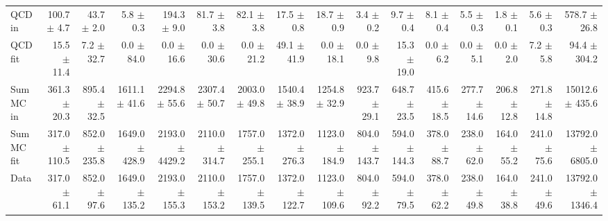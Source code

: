 \begin{table}[htbp]
{\begin{tabular}{lrrrrrrrrrrrrrrr}
\hline
QCD in & 100.7 $\pm$ 4.7 & 43.7 $\pm$ 2.0 & 5.8 $\pm$ 0.3 & 194.3 $\pm$ 9.0 & 81.7 $\pm$ 3.8 & 82.1 $\pm$ 3.8 & 17.5 $\pm$ 0.8 & 18.7 $\pm$ 0.9 & 3.4 $\pm$ 0.2 & 9.7 $\pm$ 0.4 & 8.1 $\pm$ 0.4 & 5.5 $\pm$ 0.3 & 1.8 $\pm$ 0.1 & 5.6 $\pm$ 0.3 & 578.7 $\pm$ 26.8 \\
QCD fit & 15.5 $\pm$ 11.4 & 7.2 $\pm$ 32.7 & 0.0 $\pm$ 84.0 & 0.0 $\pm$ 16.6 & 0.0 $\pm$ 30.6 & 0.0 $\pm$ 21.2 & 49.1 $\pm$ 41.9 & 0.0 $\pm$ 18.1 & 0.0 $\pm$ 9.8 & 15.3 $\pm$ 19.0 & 0.0 $\pm$ 6.2 & 0.0 $\pm$ 5.1 & 0.0 $\pm$ 2.0 & 7.2 $\pm$ 5.8 & 94.4 $\pm$ 304.2 \\
\hline
Sum MC in & 361.3 $\pm$ 20.3 & 895.4 $\pm$ 32.5 & 1611.1 $\pm$ 41.6 & 2294.8 $\pm$ 55.6 & 2307.4 $\pm$ 50.7 & 2003.0 $\pm$ 49.8 & 1540.4 $\pm$ 38.9 & 1254.8 $\pm$ 32.9 & 923.7 $\pm$ 29.1 & 648.7 $\pm$ 23.5 & 415.6 $\pm$ 18.5 & 277.7 $\pm$ 14.6 & 206.8 $\pm$ 12.8 & 271.8 $\pm$ 14.8& 15012.6 $\pm$ 435.6 \\
Sum MC fit & 317.0 $\pm$ 110.5 & 852.0 $\pm$ 235.8 & 1649.0 $\pm$ 428.9 & 2193.0 $\pm$ 4429.2 & 2110.0 $\pm$ 314.7 & 1757.0 $\pm$ 255.1 & 1372.0 $\pm$ 276.3 & 1123.0 $\pm$ 184.9 & 804.0 $\pm$ 143.7 & 594.0 $\pm$ 144.3 & 378.0 $\pm$ 88.7 & 238.0 $\pm$ 62.0 & 164.0 $\pm$ 55.2 & 241.0 $\pm$ 75.6 & 13792.0 $\pm$ 6805.0 \\
\hline
Data & 317.0 $\pm$ 61.1 & 852.0 $\pm$ 97.6 & 1649.0 $\pm$ 135.2 & 2193.0 $\pm$ 155.3 & 2110.0 $\pm$ 153.2 & 1757.0 $\pm$ 139.5 & 1372.0 $\pm$ 122.7 & 1123.0 $\pm$ 109.6 & 804.0 $\pm$ 92.2 & 594.0 $\pm$ 79.5 & 378.0 $\pm$ 62.2 & 238.0 $\pm$ 49.8 & 164.0 $\pm$ 38.8 & 241.0 $\pm$ 49.6 & 13792.0 $\pm$ 1346.4 \\
\hline
\end{tabular}
}
\end{table}
